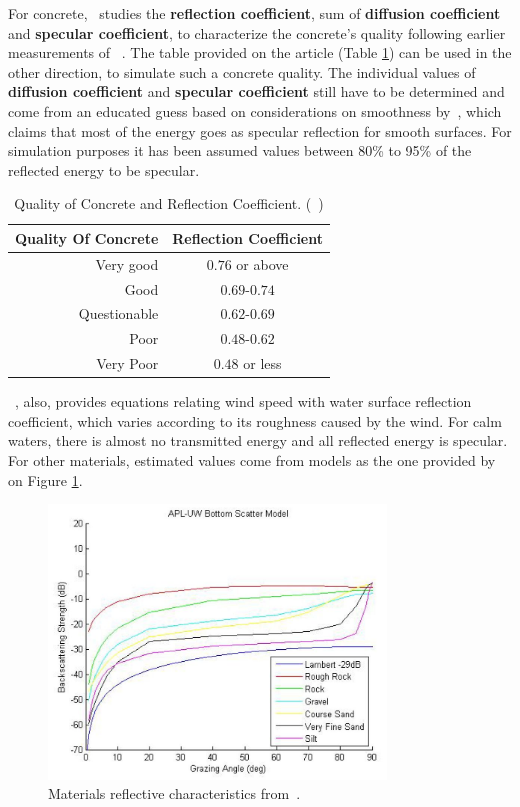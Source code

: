 For concrete,~\citet{chirp} studies the \textbf{reflection coefficient}, sum of
\textbf{diffusion coefficient} and \textbf{specular coefficient}, to
characterize the concrete's quality following earlier measurements of
~\citet{leslie1949ultrasonic}. The table provided on the article
(Table \ref{tb:concrete}) can be used in the other direction, to simulate such a
concrete quality. The individual values of \textbf{diffusion coefficient} and \textbf{specular coefficient} still have to be determined and come from an educated guess based on considerations on
smoothness by~\citet{Etter2013}, which claims that most of the energy goes as
specular reflection for smooth surfaces. For
simulation purposes it has been assumed values between 80\% to 95\% of the
reflected energy to be specular.

\begin{table}[hbt]
\centering
\begin{tabular}{rc}
Quality Of Concrete & Reflection Coefficient \\
\hline
Very good & $0.76$ or above  \\
Good & $0.69$-$0.74$  \\
Questionable & $0.62$-$0.69$  \\
Poor & $0.48$-$0.62$  \\
Very Poor & $0.48$ or less  \\
\end{tabular}
\caption{Quality of Concrete and Reflection Coefficient.
(~\citet{chirp,leslie1949ultrasonic})}
\label{tb:concrete}
\end{table}

~\citet{Etter2013}, also, provides equations relating wind speed with water
surface reflection coefficient, which varies according to its roughness caused
by the wind. For calm waters, there is almost no transmitted energy and all
reflected energy is specular. For other materials, estimated values come from
models as the one provided by~\citet{miller2015real} on
Figure \ref{fig:materials}.

\begin{figure}[h]
	\centering
	\includegraphics[width=0.8\textwidth]{Chap2/fig/materials}
	\caption{Materials reflective characteristics from~\citet{miller2015real}.}
	\label{fig:materials}
\end{figure}
